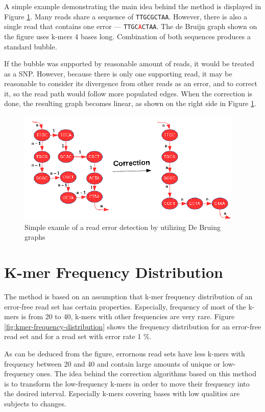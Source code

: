A simple example demonstrating the main idea behind the method is displayed in Figure \ref{fig:error-correction-db}. Many reads share a sequence of \texttt{TTGCGCTAA}. However, there is also a single read that contains one error --- \texttt{TTGC{\textcolor{red}{A}}CTAA}. The de Bruijn graph shown on the figure uses k-mers 4 bases long. Combination of both sequences produces a standard bubble.

If the bubble was supported by reasonable amount of reads, it would be treated as a SNP. However, because there is only one supporting read, it may be reasonable to consider its divergence from other reads as an error, and to correct it, so the read path would follow more populated edges. When the correction is done, the resulting graph becomes linear, as shown on the right side in Figure \ref{fig:error-correction-db}.

\begin{figure}[h]
	\centering
	\includegraphics{img/error-correction-db.pdf}
	\caption{Simple examle of a read error detection by utilizing De Bruing graphs}
	\label{fig:error-correction-db}
\end{figure}

\section{K-mer Frequency Distribution}
\label{sec:ec-kmer-frequency-distribution}

The method is based on an assumption that k-mer frequency distribution of an error-free read set has certain properties. Especially, frequency of most of the k-mers is from 20 to 40, k-mers with other frequencies are very rare. Figure \ref{fig:kmer-frequency-distribution} shows the frequency distribution for an error-free read set and for a read set with error rate 1 \%. 

As can be deduced from the figure, errornous read sets have less k-mers with frequency between 20 and 40 and contain large amounts of unique or low-frequency ones. The idea behind the correction algorithms based on this method is to transform the low-frequency k-mers in order to move their frequency into the desired interval. Especially k-mers covering bases with low qualities are subjects to changes.

